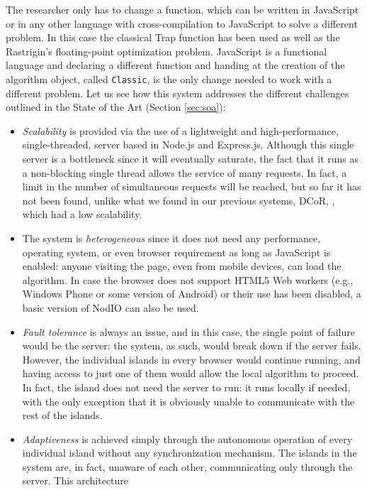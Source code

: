 \documentclass[journal,onecolumn]{IEEEtran}
\begin{document}
The researcher only has to change a function, which can be written in
JavaScript or in any other language with cross-compilation to
JavaScript \cite{web:compilersjs} to solve a different
problem. In this case the classical Trap function \cite{Ackley1987} has been
used as well as the Rastrigin's floating-point optimization
problem. JavaScript is a functional language and declaring a different 
function and handing at the creation of the algorithm object, called
{\tt Classic}, is the only change needed to work with a different
problem. Let us see how this system addresses the different challenges
outlined in the State of the Art (Section \ref{sec:soa}):
\begin{itemize}
\item {\em Scalability} is provided via the use of a lightweight and
  high-performance, single-threaded, server based in Node.js and
  Express.js. Although this single server is a bottleneck since it
  will eventually saturate, the fact that it runs as a non-blocking single thread
  allows the service of many requests. In fact, a limit in the
  number of simultaneous requests will be reached, but so far it has
  not been found, unlike what we found in our previous systems, DCoR,
  \cite{gecco07:workshop:dcor}, which had a low scalability. 
\item The system is {\em heterogeneous} since it does not need any
  performance, operating system, or even browser requirement as long
  as JavaScript is enabled: anyone
  visiting the page, even from mobile devices, can load the algorithm.
  In case the browser does not support HTML5 Web workers (e.g., 
  Windows Phone or some version of Android) or their use
  has been disabled, a basic version of {\sf NodIO} can also be used.
\item {\em Fault tolerance} is always an issue, and in this case, the
  single point of failure would be the server: the system, as such,
  would break down if the server fails. However, the individual
  islands in every browser would continue running, and having access
  to just one of them would allow the local algorithm to proceed. In
  fact, the island does not need the server to run: it runs locally if
  needed, with the only exception that it is obviously unable to
  communicate with the rest of the islands.
\item {\em Adaptiveness} is achieved simply through the autonomous
  operation of every individual island without any synchronization
  mechanism. The islands in the system are, in fact, unaware of each
  other, communicating only through the server. This architecture 

\end{itemize}
\end{document}
